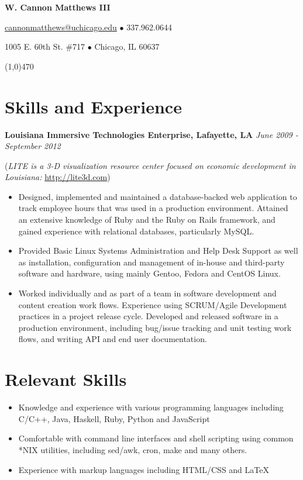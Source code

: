 \documentclass[11pt,letterpaper]{article} %
\begin{document}
 
    \centerline{\LARGE \bf W. Cannon Matthews III} 
    \centerline{ \href{mailto:cannonmatthews@uchicago.edu}{cannonmatthews@uchicago.edu} $\bullet$ 337.962.0644 } 
    \centerline{1005 E. 60th St. \#717 $\bullet$ Chicago, IL 60637 }
    \line(1,0){470} 
%
    \section*{Skills and Experience} 
        \textbf{Louisiana Immersive Technologies Enterprise, Lafayette, LA} \hfill \textit{June 2009 - September 2012} 

        \vspace{0.1in}
            \begin{footnotesize}
                (\textit{LITE is a 3-D visualization resource center focused on economic development in Louisiana: }\url{http://lite3d.com})
            \end{footnotesize}
            \begin{itemize} 
            \item  Designed, implemented and maintained a database-backed web application to track 
                   employee hours that was used in a production environment. Attained an extensive knowledge of Ruby and the 
                   Ruby on Rails framework, and gained experience with relational databases, particularly MySQL.
            \item  Provided Basic Linux Systems Administration and Help Desk Support as well as installation, configuration and 
                   management of in-house and third-party software and hardware, using mainly Gentoo, Fedora and CentOS Linux.
            \item  Worked individually and as part of a team in software development and content creation work flows.
                   Experience using SCRUM/Agile Development practices in a project release cycle. Developed and 
                   released software in a production environment, including bug/issue tracking and unit testing work flows, 
                   and writing API and end user documentation. 
            \end{itemize} 
    \section*{Relevant Skills} 
        \begin{itemize}
        \item Knowledge and experience with various programming languages including C/C++, Java, Haskell, Ruby, Python and JavaScript    
        \item Comfortable with command line interfaces and shell scripting using common *NIX utilities, including sed/awk, cron, make and many others. 
        \item Experience with markup languages including HTML/CSS and \LaTeX 
        \end{itemize}          
\end{document}
